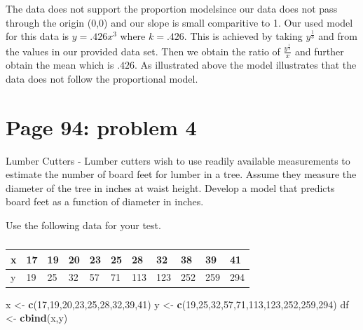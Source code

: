 \documentclass[]{article}
\newenvironment{Shaded}{\begin{snugshade}}{\end{snugshade}}
\newcommand{\KeywordTok}[1]{\textcolor[rgb]{0.13,0.29,0.53}{\textbf{{#1}}}}
\newcommand{\DecValTok}[1]{\textcolor[rgb]{0.00,0.00,0.81}{{#1}}}
\newcommand{\StringTok}[1]{\textcolor[rgb]{0.31,0.60,0.02}{{#1}}}
\newcommand{\NormalTok}[1]{{#1}}
\begin{document}
The data does not support the proportion modelsince our data does not
pass through the origin (0,0) and our slope is small comparitive to 1.
Our used model for this data is \(y = .426x^3\) where \(k = .426\). This
is achieved by taking \(y^\frac{1}{3}\) and from the values in our
provided data set. Then we obtain the ratio of
\(\frac{y^\frac{1}{3}}{x}\) and further obtain the mean which is
\(.426\). As illustrated above the model illustrates that the data does
not follow the proportional model.

\section{Page 94: problem 4}\label{page-94-problem-4}

Lumber Cutters - Lumber cutters wish to use readily available
measurements to estimate the number of board feet for lumber in a tree.
Assume they measure the diameter of the tree in inches at waist height.
Develop a model that predicts board feet as a function of diameter in
inches.

Use the following data for your test.

\begin{table}[!htbp]
\centering
\caption{}
\label{my-label}
\begin{tabular}{l|llllllllll}
x & 17 & 19 & 20 & 23 & 25 & 28 & 32 & 38 & 39 & 41 \\ \hline
y & 19 & 25 & 32 & 57 & 71 & 113 & 123 & 252 & 259 & 294
\end{tabular}
\end{table}

\begin{Shaded}
\begin{Highlighting}[]
\NormalTok{x <-}\StringTok{ }\KeywordTok{c}\NormalTok{(}\DecValTok{17}\NormalTok{,}\DecValTok{19}\NormalTok{,}\DecValTok{20}\NormalTok{,}\DecValTok{23}\NormalTok{,}\DecValTok{25}\NormalTok{,}\DecValTok{28}\NormalTok{,}\DecValTok{32}\NormalTok{,}\DecValTok{39}\NormalTok{,}\DecValTok{41}\NormalTok{)}
\NormalTok{y <-}\StringTok{ }\KeywordTok{c}\NormalTok{(}\DecValTok{19}\NormalTok{,}\DecValTok{25}\NormalTok{,}\DecValTok{32}\NormalTok{,}\DecValTok{57}\NormalTok{,}\DecValTok{71}\NormalTok{,}\DecValTok{113}\NormalTok{,}\DecValTok{123}\NormalTok{,}\DecValTok{252}\NormalTok{,}\DecValTok{259}\NormalTok{,}\DecValTok{294}\NormalTok{)}
\NormalTok{df <-}\StringTok{ }\KeywordTok{cbind}\NormalTok{(x,y)}
\end{Highlighting}
\end{Shaded}
\end{document}
